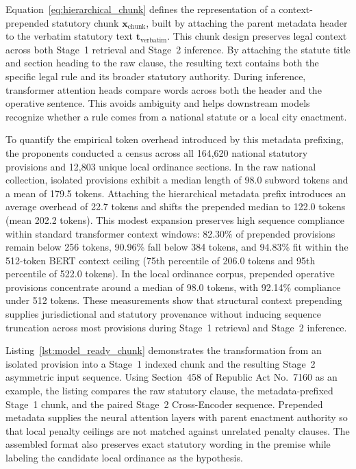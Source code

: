         Equation~\ref{eq:hierarchical_chunk} defines the representation of a context-prepended statutory chunk $\mathbf{x}_{\text{chunk}}$, built by attaching the parent metadata header to the verbatim statutory text $\mathbf{t}_{\text{verbatim}}$. This chunk design preserves legal context across both Stage~1 retrieval and Stage~2 inference. By attaching the statute title and section heading to the raw clause, the resulting text contains both the specific legal rule and its broader statutory authority. During inference, transformer attention heads compare words across both the header and the operative sentence. This avoids ambiguity and helps downstream models recognize whether a rule comes from a national statute or a local city enactment.

        To quantify the empirical token overhead introduced by this metadata prefixing, the proponents conducted a census across all 164,620 national statutory provisions and 12,803 unique local ordinance sections. In the raw national collection, isolated provisions exhibit a median length of 98.0 subword tokens and a mean of 179.5 tokens. Attaching the hierarchical metadata prefix introduces an average overhead of 22.7 tokens and shifts the prepended median to 122.0 tokens (mean 202.2 tokens). This modest expansion preserves high sequence compliance within standard transformer context windows: 82.30\% of prepended provisions remain below 256 tokens, 90.96\% fall below 384 tokens, and 94.83\% fit within the 512-token BERT context ceiling (75th percentile of 206.0 tokens and 95th percentile of 522.0 tokens). In the local ordinance corpus, prepended operative provisions concentrate around a median of 98.0 tokens, with 92.14\% compliance under 512 tokens. These measurements show that structural context prepending supplies jurisdictional and statutory provenance without inducing sequence truncation across most provisions during Stage~1 retrieval and Stage~2 inference.

        Listing~\ref{lst:model_ready_chunk} demonstrates the transformation from an isolated provision into a Stage~1 indexed chunk and the resulting Stage~2 asymmetric input sequence. Using Section~458 of Republic Act No.~7160 as an example, the listing compares the raw statutory clause, the metadata-prefixed Stage~1 chunk, and the paired Stage~2 Cross-Encoder sequence. Prepended metadata supplies the neural attention layers with parent enactment authority so that local penalty ceilings are not matched against unrelated penalty clauses. The assembled format also preserves exact statutory wording in the premise while labeling the candidate local ordinance as the hypothesis.

